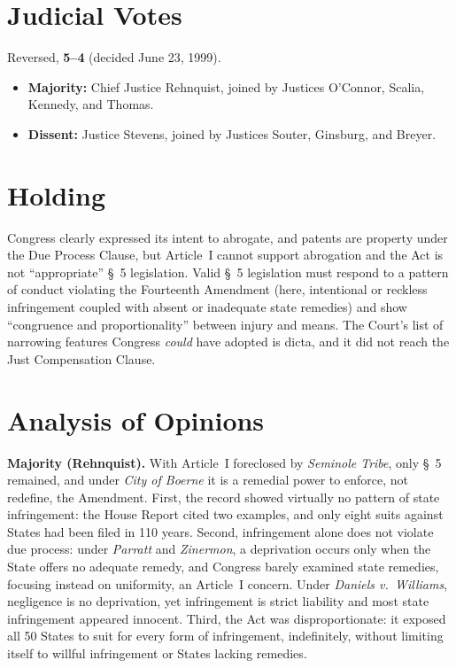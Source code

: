 \documentclass[12pt]{article}
\begin{document}
\section{Judicial Votes}

Reversed, \textbf{5--4} (decided June 23, 1999).
\begin{itemize}
\item \textbf{Majority:} Chief Justice Rehnquist, joined by Justices O'Connor, Scalia, Kennedy, and Thomas.
\item \textbf{Dissent:} Justice Stevens, joined by Justices Souter, Ginsburg, and Breyer.
\end{itemize}

\section{Holding}

Congress clearly expressed its intent to abrogate, and patents are property under the Due Process Clause, but Article~I cannot support abrogation and the Act is not ``appropriate'' \S~5 legislation. Valid \S~5 legislation must respond to a pattern of conduct violating the Fourteenth Amendment (here, intentional or reckless infringement coupled with absent or inadequate state remedies) and show ``congruence and proportionality'' between injury and means. The Court's list of narrowing features Congress \textit{could} have adopted is dicta, and it did not reach the Just Compensation Clause.

\section{Analysis of Opinions}

\textbf{Majority (Rehnquist).} With Article~I foreclosed by \textit{Seminole Tribe}, only \S~5 remained, and under \textit{City of Boerne} it is a remedial power to enforce, not redefine, the Amendment. First, the record showed virtually no pattern of state infringement: the House Report cited two examples, and only eight suits against States had been filed in 110 years. Second, infringement alone does not violate due process: under \textit{Parratt} and \textit{Zinermon}, a deprivation occurs only when the State offers no adequate remedy, and Congress barely examined state remedies, focusing instead on uniformity, an Article~I concern. Under \textit{Daniels v.\ Williams}, negligence is no deprivation, yet infringement is strict liability and most state infringement appeared innocent. Third, the Act was disproportionate: it exposed all 50 States to suit for every form of infringement, indefinitely, without limiting itself to willful infringement or States lacking remedies.
\end{document}
